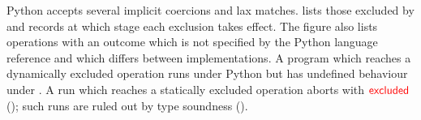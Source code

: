 Python accepts several implicit coercions and lax matches.  lists those excluded by
\PurePy and records at which stage each exclusion takes effect. The figure also lists operations with an outcome which is not specified by the Python language reference and which differs between implementations. A program which reaches a dynamically excluded operation runs under Python but has undefined behaviour under
\PurePy. A run which reaches a statically excluded operation aborts with $\textcolor{red}{\mathsf{excluded}}$ (); such runs are ruled out by type soundness ().


